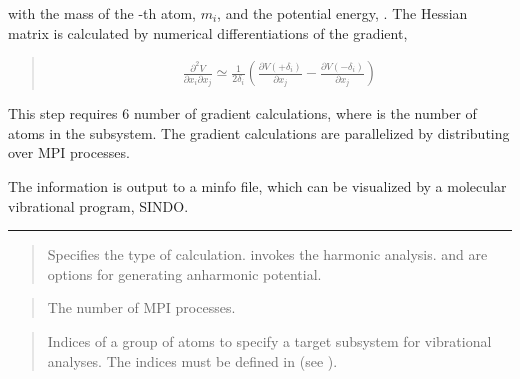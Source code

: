 \documentclass[a4paper,11pt,oneside,english]{sphinxmanual}
\begin{document}
with the mass of the -th atom, \(m_i\), and the potential energy, .
The Hessian matrix is calculated by numerical differentiations of the gradient,
\begin{quote}
\begin{equation*}
\begin{split}\frac{\partial^2 V}{\partial x_i \partial x_j} \simeq
\frac{1}{2 \delta_i} \left( \frac{\partial V (+\delta_i)}{\partial x_j}
- \frac{\partial V(-\delta_i)}{\partial x_j} \right)\end{split}
\end{equation*}\end{quote}

This step requires 6  number of gradient calculations, where  is
the number of atoms in the subsystem.  The gradient calculations are
parallelized by distributing over MPI processes.

The information is output to a minfo file, which can be visualized by a
molecular vibrational program, SINDO.


\bigskip\hrule\bigskip


 
\begin{quote}


Specifies the type of calculation.  invokes the harmonic analysis.
 and  are options for generating anharmonic potential.
\end{quote}

 
\begin{quote}


The number of MPI processes.
\end{quote}

 
\begin{quote}


Indices of a group of atoms to specify a target subsystem
for vibrational analyses.  The indices must be defined in
\sphinxstylestrong{{[}SELECTION{]}} (see {\hyperref[\detokenize{11_Selection:selection}]{}}).
\end{quote}
\end{document}
